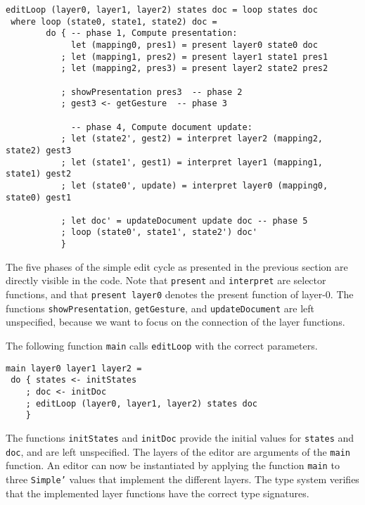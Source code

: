 \begin{small}
\begin{verbatim}
editLoop (layer0, layer1, layer2) states doc = loop states doc
 where loop (state0, state1, state2) doc = 
        do { -- phase 1, Compute presentation:
             let (mapping0, pres1) = present layer0 state0 doc
           ; let (mapping1, pres2) = present layer1 state1 pres1
           ; let (mapping2, pres3) = present layer2 state2 pres2

           ; showPresentation pres3  -- phase 2
           ; gest3 <- getGesture  -- phase 3
 
             -- phase 4, Compute document update: 
           ; let (state2', gest2) = interpret layer2 (mapping2, state2) gest3
           ; let (state1', gest1) = interpret layer1 (mapping1, state1) gest2
           ; let (state0', update) = interpret layer0 (mapping0, state0) gest1
       
           ; let doc' = updateDocument update doc -- phase 5
           ; loop (state0', state1', state2') doc'
           }
\end{verbatim}
\end{small}


The five phases of the simple edit cycle as presented in the previous section are directly visible in the code. Note that \texttt{present} and \texttt{interpret} are selector functions, and that \texttt{present layer0} denotes the present function of layer-0. The functions \texttt{showPresentation}, \texttt{getGesture}, and \texttt{updateDocument} are left unspecified, because we want to focus on the connection of the layer functions. 

The following function \texttt{main} calls \texttt{editLoop} with the correct parameters.

\begin{small}
\begin{verbatim}
main layer0 layer1 layer2 = 
 do { states <- initStates
    ; doc <- initDoc 
    ; editLoop (layer0, layer1, layer2) states doc
    }
\end{verbatim}
\end{small}

The functions \texttt{initStates} and \texttt{initDoc} provide the initial values for \texttt{states} and \texttt{doc}, and are left unspecified. The layers of the editor are arguments of the \texttt{main} function. An editor can now be instantiated by applying the function \texttt{main} to three \texttt{Simple'} values that implement the different layers. The type system verifies that the implemented layer functions have the correct type signatures.

